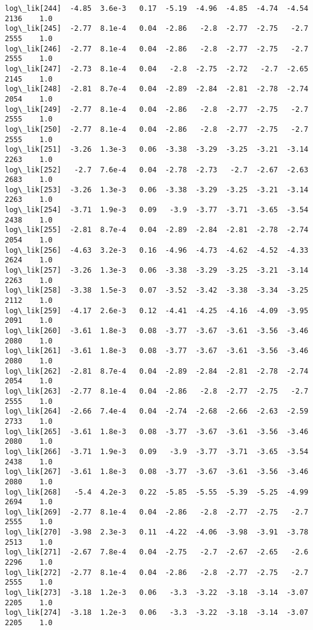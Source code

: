 \documentclass[11pt]{article}
\begin{document}
\begin{Verbatim}[commandchars=\\\{\}]
log\_lik[244]  -4.85  3.6e-3   0.17  -5.19  -4.96  -4.85  -4.74  -4.54   2136    1.0
log\_lik[245]  -2.77  8.1e-4   0.04  -2.86   -2.8  -2.77  -2.75   -2.7   2555    1.0
log\_lik[246]  -2.77  8.1e-4   0.04  -2.86   -2.8  -2.77  -2.75   -2.7   2555    1.0
log\_lik[247]  -2.73  8.1e-4   0.04   -2.8  -2.75  -2.72   -2.7  -2.65   2145    1.0
log\_lik[248]  -2.81  8.7e-4   0.04  -2.89  -2.84  -2.81  -2.78  -2.74   2054    1.0
log\_lik[249]  -2.77  8.1e-4   0.04  -2.86   -2.8  -2.77  -2.75   -2.7   2555    1.0
log\_lik[250]  -2.77  8.1e-4   0.04  -2.86   -2.8  -2.77  -2.75   -2.7   2555    1.0
log\_lik[251]  -3.26  1.3e-3   0.06  -3.38  -3.29  -3.25  -3.21  -3.14   2263    1.0
log\_lik[252]   -2.7  7.6e-4   0.04  -2.78  -2.73   -2.7  -2.67  -2.63   2683    1.0
log\_lik[253]  -3.26  1.3e-3   0.06  -3.38  -3.29  -3.25  -3.21  -3.14   2263    1.0
log\_lik[254]  -3.71  1.9e-3   0.09   -3.9  -3.77  -3.71  -3.65  -3.54   2438    1.0
log\_lik[255]  -2.81  8.7e-4   0.04  -2.89  -2.84  -2.81  -2.78  -2.74   2054    1.0
log\_lik[256]  -4.63  3.2e-3   0.16  -4.96  -4.73  -4.62  -4.52  -4.33   2624    1.0
log\_lik[257]  -3.26  1.3e-3   0.06  -3.38  -3.29  -3.25  -3.21  -3.14   2263    1.0
log\_lik[258]  -3.38  1.5e-3   0.07  -3.52  -3.42  -3.38  -3.34  -3.25   2112    1.0
log\_lik[259]  -4.17  2.6e-3   0.12  -4.41  -4.25  -4.16  -4.09  -3.95   2091    1.0
log\_lik[260]  -3.61  1.8e-3   0.08  -3.77  -3.67  -3.61  -3.56  -3.46   2080    1.0
log\_lik[261]  -3.61  1.8e-3   0.08  -3.77  -3.67  -3.61  -3.56  -3.46   2080    1.0
log\_lik[262]  -2.81  8.7e-4   0.04  -2.89  -2.84  -2.81  -2.78  -2.74   2054    1.0
log\_lik[263]  -2.77  8.1e-4   0.04  -2.86   -2.8  -2.77  -2.75   -2.7   2555    1.0
log\_lik[264]  -2.66  7.4e-4   0.04  -2.74  -2.68  -2.66  -2.63  -2.59   2733    1.0
log\_lik[265]  -3.61  1.8e-3   0.08  -3.77  -3.67  -3.61  -3.56  -3.46   2080    1.0
log\_lik[266]  -3.71  1.9e-3   0.09   -3.9  -3.77  -3.71  -3.65  -3.54   2438    1.0
log\_lik[267]  -3.61  1.8e-3   0.08  -3.77  -3.67  -3.61  -3.56  -3.46   2080    1.0
log\_lik[268]   -5.4  4.2e-3   0.22  -5.85  -5.55  -5.39  -5.25  -4.99   2694    1.0
log\_lik[269]  -2.77  8.1e-4   0.04  -2.86   -2.8  -2.77  -2.75   -2.7   2555    1.0
log\_lik[270]  -3.98  2.3e-3   0.11  -4.22  -4.06  -3.98  -3.91  -3.78   2513    1.0
log\_lik[271]  -2.67  7.8e-4   0.04  -2.75   -2.7  -2.67  -2.65   -2.6   2296    1.0
log\_lik[272]  -2.77  8.1e-4   0.04  -2.86   -2.8  -2.77  -2.75   -2.7   2555    1.0
log\_lik[273]  -3.18  1.2e-3   0.06   -3.3  -3.22  -3.18  -3.14  -3.07   2205    1.0
log\_lik[274]  -3.18  1.2e-3   0.06   -3.3  -3.22  -3.18  -3.14  -3.07   2205    1.0

\end{Verbatim}
\end{document}

